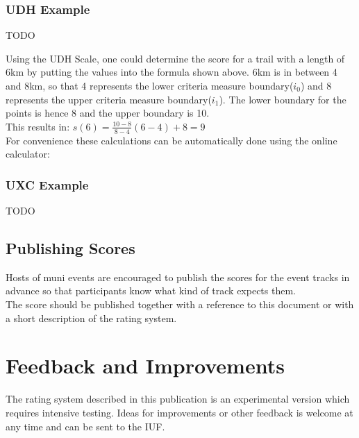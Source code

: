\documentclass[a4paper,oneside]{scrartcl}
\begin{document}
\subsubsection{UDH Example}
TODO%

Using the UDH Scale, one could determine the score for a trail with a length of
6km by putting the values into the formula shown above. 6km is in between 4 and
8km, so that 4 represents the lower criteria measure boundary($i_0$) and 8
represents the upper criteria measure boundary($i_1$). The lower boundary for
the points is hence 8 and the upper boundary is 10.\\
This results in: $s(6) = \frac{10 - 8}{8 - 4} (6 - 4) + 8 = 9$\\

For convenience these calculations can be automatically done using the
online calculator: %

\subsubsection{UXC Example}
TODO



\subsection{Publishing Scores}
Hosts of muni events are encouraged to publish the scores for the event tracks
in advance so that participants know what kind of track expects them.\\ The
score should be published together with a reference to this document or with a
short description of the rating system.

\section{Feedback and Improvements}
The rating system described in this publication is an experimental version which
requires intensive testing. Ideas for improvements or other feedback is welcome
at any time and can be sent to the IUF.
\end{document}
